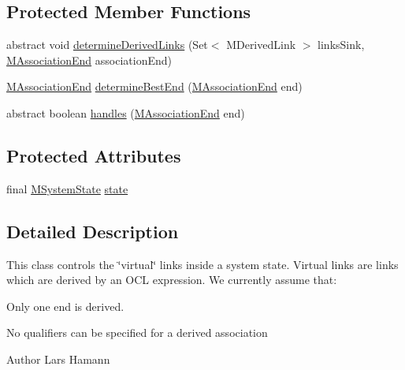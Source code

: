 \subsection*{Protected Member Functions}
\begin{DoxyCompactItemize}
\item 
abstract void \hyperlink{classorg_1_1tzi_1_1use_1_1uml_1_1sys_1_1_derived_link_controller_a5f4ff83ec52ea895fb1a8418ae1762e6}{determine\-Derived\-Links} (Set$<$ M\-Derived\-Link $>$ links\-Sink, \hyperlink{classorg_1_1tzi_1_1use_1_1uml_1_1mm_1_1_m_association_end}{M\-Association\-End} association\-End)
\item 
\hyperlink{classorg_1_1tzi_1_1use_1_1uml_1_1mm_1_1_m_association_end}{M\-Association\-End} \hyperlink{classorg_1_1tzi_1_1use_1_1uml_1_1sys_1_1_derived_link_controller_a5533b8f417f76bddd4f3786bd952dd23}{determine\-Best\-End} (\hyperlink{classorg_1_1tzi_1_1use_1_1uml_1_1mm_1_1_m_association_end}{M\-Association\-End} end)
\item 
abstract boolean \hyperlink{classorg_1_1tzi_1_1use_1_1uml_1_1sys_1_1_derived_link_controller_a5d650ad9fdc7efe9e82546fe90288596}{handles} (\hyperlink{classorg_1_1tzi_1_1use_1_1uml_1_1mm_1_1_m_association_end}{M\-Association\-End} end)
\end{DoxyCompactItemize}
\subsection*{Protected Attributes}
\begin{DoxyCompactItemize}
\item 
final \hyperlink{classorg_1_1tzi_1_1use_1_1uml_1_1sys_1_1_m_system_state}{M\-System\-State} \hyperlink{classorg_1_1tzi_1_1use_1_1uml_1_1sys_1_1_derived_link_controller_a2870a3282e4dfeb13685cc71956abf78}{state}
\end{DoxyCompactItemize}


\subsection{Detailed Description}
This class controls the \char`\"{}virtual\char`\"{} links inside a system state. Virtual links are links which are derived by an O\-C\-L expression. We currently assume that\-: 
\begin{DoxyItemize}
\item Only one end is derived. 
\item No qualifiers can be specified for a derived association 
\end{DoxyItemize}\begin{DoxyAuthor}{Author}
Lars Hamann 
\end{DoxyAuthor}


